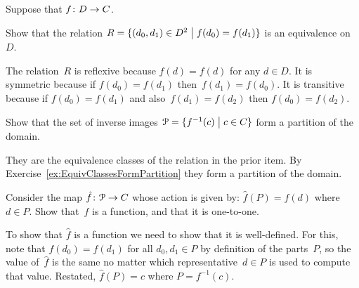 \documentclass{ibl}  %
\begin{document}
\begin{problem}
\end{problem}

\begin{problem}
Suppose that $\mbox{$f\colon D\to C$}$.
\begin{exes}
\begin{exercise} 
  Show that the relation
  $R=\{(d_0,d_1)\in D^2 \bigm| f(d_0)=f(d_1)\}$ 
  is an equivalence on~$D$.
\end{exercise} 
\begin{answer}
  The relation~$R$ is reflexive because $f(d)=f(d)$ for any $d\in D$.
  It is symmetric because if $f(d_0)=f(d_1)$ then~$f(d_1)=f(d_0)$.
  It is transitive because if $f(d_0)=f(d_1)$ and also~$f(d_1)=f(d_2)$ 
  then $f(d_0)=f(d_2)$.  
\end{answer}
\begin{exercise} 
  Show that the set of inverse images 
  $\EuScript{P}=\{f^{-1}(c) \bigm| c\in C\}$ form a partition of the domain.
\end{exercise}
\begin{answer}
  They are the equivalence classes of the relation in the prior 
  item.
  By Exercise~\ref{ex:EquivClassesFormPartition} they form a
  partition of the domain.  
\end{answer}
\begin{exercise} 
  Consider the map
  $\mbox{$\hat{f}\colon \EuScript{P}\to C$}$ whose action is given by:
  $\hat{f}(P)=f(d)$ where $d\in P$.
  Show that~$\hat{f}$ is a function, and that it is one-to-one.
\end{exercise}
\begin{answer}
  To show that $\hat{f}$ is a function we need to show that
  it is well-defined.
  For this, note that $f(d_0)=f(d_1)$ for all $d_0,d_1\in P$
  by definition of the parts~$P$, so 
  the value of~$\hat{f}$ is the same no matter which representative~$d\in P$
  is used to compute that value.
  Restated, $\hat{f}(P)=c$ where $P=f^{-1}(c)$.


\end{answer}
\end{exes}
\end{problem}
\end{document}
